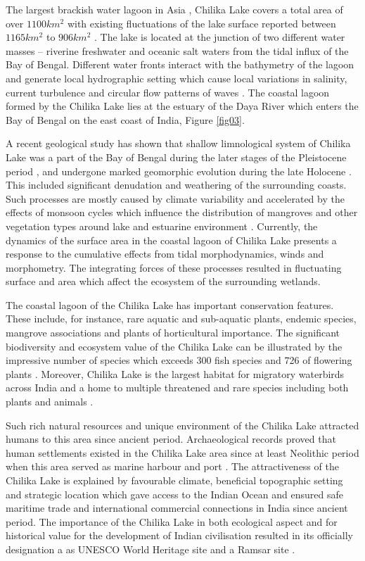 \documentclass[jmse,article,submit,pdftex,moreauthors]{Definitions/mdpi}
\begin{document}
The largest brackish water lagoon in Asia \cite{BEHERA2020101328,BARIK201739}, Chilika Lake covers a total area of over $1100 km^2$ with existing fluctuations of the lake surface reported between $1165 km^2$ to $906 km^2$ \cite{Behera2023}. The lake is located at the junction of two different water masses -- riverine freshwater and oceanic salt waters from the tidal influx of the Bay of Bengal. Different water fronts interact with the bathymetry of the lagoon and generate local hydrographic setting which cause local variations in salinity, current turbulence and circular flow patterns of waves \cite{Nazneen}. The coastal lagoon formed by the Chilika Lake lies at the estuary of the Daya River which enters the Bay of Bengal on the east coast of India, Figure \ref{fig03}. 

A recent geological study has shown that shallow limnological system of Chilika Lake was a part of the Bay of Bengal during the later stages of the Pleistocene period \cite{BOROLE1993761}, and undergone marked geomorphic evolution during the late Holocene \cite{MISHRA2022457,AMIR2021148}. This included significant denudation and weathering of the surrounding coasts. Such processes are mostly caused by climate variability and accelerated by the effects of monsoon cycles which influence the distribution of mangroves and other vegetation types around lake and estuarine environment \cite{DASH2023106754}. Currently, the dynamics of the surface area in the coastal lagoon of Chilika Lake presents a response to the cumulative effects from tidal morphodynamics, winds and morphometry. The integrating forces of these processes resulted in fluctuating surface and area which affect the ecosystem of the surrounding wetlands.

The coastal lagoon of the Chilika Lake has important conservation features. These include, for instance, rare aquatic and sub-aquatic plants, endemic species, mangrove associations and plants of horticultural importance. The significant biodiversity and ecosystem value of the Chilika Lake can be illustrated by the impressive number of species which exceeds 300 fish species \cite{MOHAPATRA2015195} and 726 of flowering plants \cite{Sarkar2012}. Moreover, Chilika Lake is the largest habitat for migratory waterbirds across India and a home to multiple threatened and rare species including both plants and animals \cite{Balachandran2020}. 

Such rich natural resources and unique environment of the Chilika Lake attracted humans to this area since ancient period. Archaeological records proved that human settlements existed in the Chilika Lake area since at least Neolithic period when this area served as marine harbour and port  \cite{DASH2022105190}. The attractiveness of the Chilika Lake is explained by favourable climate, beneficial topographic setting and strategic location which gave access to the Indian Ocean and ensured safe maritime trade and international commercial connections in India since ancient period. The importance of the Chilika Lake in both ecological aspect and for historical value for the development of Indian civilisation resulted in its officially designation a as UNESCO World Heritage site \cite{SETHY2023497} and a Ramsar site \cite{BHUVANAGIRI2018343}.
\end{document}
